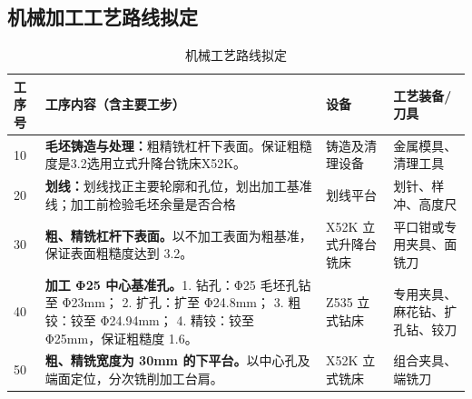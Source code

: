 \documentclass[12pt,a4paper,fontset=none]{ctexart}
\begin{document}
    \subsection{机械加工工艺路线拟定}

    \begin{table}[H]
        \centering
        \caption{机械工艺路线拟定}
        \begin{tabular}{p{1.5cm} p{6.5cm} p{3cm} p{3cm}}
            \toprule
            工序号 & 工序内容（含主要工步）                                                                                                                                                   & 设备           & 工艺装备/刀具              \\
            \midrule
            10  & \textbf{ 毛坯铸造与处理：}\newline{}粗精铣杠杆下表面。保证粗糙度是3.2选用立式升降台铣床X52K。\newline{}                                                                                        & 铸造及清理设备 & 金属模具、清理工具 \\
            20  & \textbf{划线：}\newline{}划线找正主要轮廓和孔位，划出加工基准线；加工前检验毛坯余量是否合格\newline{}                                                                                             & 划线平台         & 划针、样冲、高度尺            \\
            30  & \textbf{粗、精铣杠杆下表面。}\newline{}以不加工表面为粗基准，保证表面粗糙度达到 3.2。 \newline{}                                                                                             & X52K 立式升降台铣床 & 平口钳或专用夹具、面铣刀 \\
            40  & \textbf{加工 Φ25 中心基准孔。}\newline{}1. 钻孔：Φ25 毛坯孔钻至 Φ23mm； \newline{}2. 扩孔：扩至 Φ24.8mm； \newline{}3. 粗铰：铰至 Φ24.94mm； \newline{}4. 精铰：铰至 Φ25mm，保证粗糙度 1.6。\newline{} & Z535 立式钻床 & 专用夹具、麻花钻、扩孔钻、铰刀 \\
            50  & \textbf{粗、精铣宽度为 30mm 的下平台。}\newline{}以中心孔及端面定位，分次铣削加工台肩。 \newline{}                                                                                           & X52K 立式铣床 & 组合夹具、端铣刀 \\

\end{tabular}
\end{table}
\end{document}
